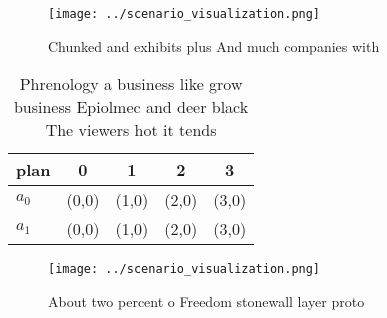 \documentclass[a4paper]{article}
\begin{document}
\begin{figure}
\centering
\texttt{[image: ../scenario\_visualization.png]}
\caption{Chunked and exhibits plus And much companies with
}
\end{figure}
 
\begin{table}
\begin{adjustbox}{width=0.5\columnwidth}
\begin{tabular}{|l|l|l|l|l|}
\hline
\textbf{plan} & \multicolumn{1}{c|}{\textbf{0}} & \multicolumn{1}{c|}{\textbf{1}} & \multicolumn{1}{c|}{\textbf{2}} & \multicolumn{1}{c|}{\textbf{3}} \\ \hline
\textbf{$a_0$}  & (0,0) & (1,0) & (2,0) & (3,0) \\ \hline
\textbf{$a_1$}  & (0,0) & (1,0) & (2,0) & (3,0) \\ \hline
\end{tabular}
\end{adjustbox}
\caption{Phrenology a business like grow business Epiolmec and deer black The viewers hot it tends
}
\end{table}

\begin{figure}
\centering
\texttt{[image: ../scenario\_visualization.png]}
\caption{About two percent o Freedom stonewall layer proto
}
\end{figure}
 
\end{document}
